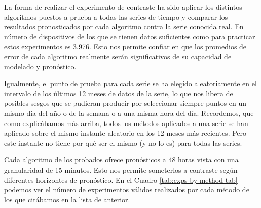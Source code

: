 \documentclass[]{book}
\begin{document}
La forma de realizar el experimento de contraste ha sido aplicar los
distintos algoritmos puestos a prueba a todas las series de tiempo y
comparar los resultados pronosticados por cada algoritmo contra la serie
conocida real. En número de dispositivos de los que se tienen datos
suficientes como para practicar estos experimentos es 3.976. Esto nos
permite confiar en que los promedios de error de cada algoritmo
realmente serán significativos de su capacidad de modelado y pronóstico.

Igualmente, el punto de prueba para cada serie se ha elegido
aleatoriamente en el intervalo de los últimos 12 meses de datos de la
serie, lo que nos libera de posibles sesgos que se pudieran producir por
seleccionar siempre puntos en un mismo día del año o de la semana o a
una misma hora del día. Recordemos, que como explicábamos más arriba,
todos los métodos aplicados a una serie se han aplicado sobre el mismo
instante aleatorio en los 12 meses más recientes. Pero este instante no
tiene por qué ser el mismo (y no lo es) para todas las series.

Cada algoritmo de los probados ofrece pronósticos a 48 horas vista con
una granularidad de 15 minutos. Esto nos permite someterlos a contraste
según diferentes horizontes de pronóstico. En el Cuadro
\ref{tab:exps-by-method-tab} podemos ver el número de experimentos
válidos realizados por cada método de los que citábamos en la lista de
anterior.
\end{document}
